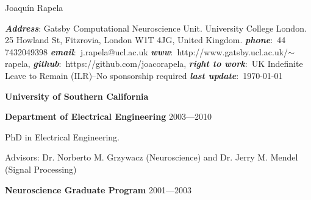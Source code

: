 \documentclass{article}
\begin{document}
\reversemarginpar		%

{\huge{Joaqu\'{i}n Rapela}}	%

\renewcommand{\labelitemi}{$\star$}
\textit{\textbf{Address}}: Gatsby Computational Neuroscience Unit. University
College London. 25 Howland St, Fitzrovia, London W1T 4JG, United Kingdom.
\textit{\textbf{phone}}:~44 7432049398
\textit{\textbf{email}}:~j.rapela@ucl.ac.uk
\textit{\textbf{www}}:~http://www.gatsby.ucl.ac.uk/$\sim$rapela,
\textit{\textbf{github}}:~https://github.com/joacorapela,
\textit{\textbf{right to work}}:~UK Indefinite Leave to Remain (ILR)--No sponsorship required
\textit{\textbf{last update}}:~\today

\par
\vspace{2\baselineskip}
{\bf University of Southern California} 

\par
\vspace{.05in}
{\bf Department of Electrical Engineering} \hspace*{\fill} 2003---2010
\par

\par
PhD in Electrical Engineering.
\par
Advisors: Dr. Norberto M. Grzywacz (Neuroscience) and Dr. Jerry M. Mendel (Signal Processing)
\par
\vspace{.05in}
{\bf Neuroscience Graduate Program} \hspace*{\fill} 2001---2003
\par
\end{document}
